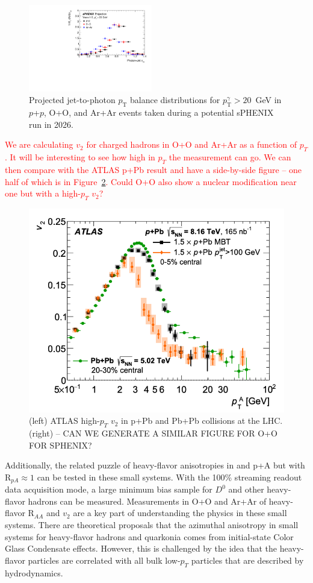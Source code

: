 \begin{figure}[h]
\centering
\includegraphics[width=0.48\textwidth]{figs/xJg_3}
\caption{Projected jet-to-photon $p_\mathrm{T}$ balance distributions for $p_\mathrm{T}^{\gamma} > 20$~GeV in $p$+$p$, O+O, and Ar+Ar events taken during a potential sPHENIX run in 2026.}
\label{fig:jet_xJg_SmallSystems}
\end{figure}

{\textcolor{red}{We are calculating $v_{2}$ for charged hadrons in O+O and Ar+Ar as a function of $p_T$.   It will be interesting to see how high in $p_T$ the measurement can go.   We can then compare with the ATLAS p+Pb result and have a side-by-side figure -- one half of which is in Figure~\ref{fig:atlaspbhighpt}.   Could O+O also show a nuclear modification near one but with a high-$p_{T}$ $v_2$?}}

\begin{figure}
    \centering
    \includegraphics[width=0.47\linewidth]{figs/figure_atlas_highptv2_ppb.png}
    \caption{(left) ATLAS high-$p_{T}$ $v_{2}$ in p+Pb and Pb+Pb collisions at the LHC.
    (right) -- CAN WE GENERATE A SIMILAR FIGURE FOR O+O FOR SPHENIX? {\color{red}{DVP: Yes, but after the initial circulation to the Collaboration}}}
    \label{fig:atlaspbhighpt}
\end{figure}

Additionally, the related puzzle of heavy-flavor anisotropies in \pp and p+A but with R$_{pA} \approx 1$ can be tested in these small systems.   With the 100\% streaming readout data acquisition mode, a large minimum bias sample for $D^{0}$ and other heavy-flavor hadrons can be measured.    Measurements in O+O and Ar+Ar of heavy-flavor R$_{AA}$ and $v_{2}$ are a key part of understanding the physics in these small systems.   There are theoretical proposals that the azimuthal anisotropy in small systems for heavy-flavor hadrons and quarkonia comes from initial-state Color Glass Condensate effects.   However, this is challenged by the idea that the heavy-flavor particles are correlated with all bulk low-$p_{T}$ particles that are described by hydrodynamics.

